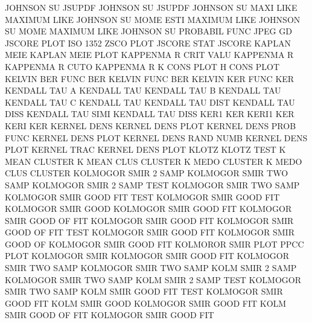 JOHNSON  SU                             JSUPDF
JOHNSON  SU                             JSUPDF
JOHNSON  SU   MAXI LIKE                 MAXIMUM  LIKE
JOHNSON  SU   MOME ESTI                 MAXIMUM  LIKE
JOHNSON  SU   MOME                      MAXIMUM  LIKE
JOHNSON  SU                             PROBABIL FUNC
JPEG                                    GD
JSCORE   PLOT                           ISO      1352 ZSCO PLOT
JSCORE   STAT                           JSCORE
KAPLAN   MEIE                           KAPLAN   MEIE PLOT
KAPPENMA R    CRIT VALU                 KAPPENMA R
KAPPENMA R    CUTO                      KAPPENMA R
K        CONS PLOT                      H        CONS PLOT
KELVIN   BER  FUNC                      BER
KELVIN   FUNC                           BER
KELVIN   KER  FUNC                      KER
KENDALL  TAU  A                         KENDALL  TAU
KENDALL  TAU  B                         KENDALL  TAU
KENDALL  TAU  C                         KENDALL  TAU
KENDALL  TAU  DIST                      KENDALL  TAU  DISS
KENDALL  TAU  SIMI                      KENDALL  TAU  DISS
KER1                                    KER
KERI1                                   KER
KERI                                    KER
KERNEL   DENS                           KERNEL   DENS PLOT
KERNEL   DENS PROB FUNC                 KERNEL   DENS PLOT
KERNEL   DENS RAND NUMB                 KERNEL   DENS PLOT
KERNEL   TRAC                           KERNEL   DENS PLOT
KLOTZ                                   KLOTZ    TEST
K        MEAN                           CLUSTER
K        MEAN CLUS                      CLUSTER
K        MEDO                           CLUSTER
K        MEDO CLUS                      CLUSTER
KOLMOGOR SMIR 2    SAMP                 KOLMOGOR SMIR TWO  SAMP
KOLMOGOR SMIR 2    SAMP TEST            KOLMOGOR SMIR TWO  SAMP
KOLMOGOR SMIR GOOD FIT  TEST            KOLMOGOR SMIR GOOD FIT
KOLMOGOR SMIR GOOD                      KOLMOGOR SMIR GOOD FIT
KOLMOGOR SMIR GOOD OF   FIT             KOLMOGOR SMIR GOOD FIT
KOLMOGOR SMIR GOOD OF   FIT  TEST       KOLMOGOR SMIR GOOD FIT
KOLMOGOR SMIR GOOD OF                   KOLMOGOR SMIR GOOD FIT
KOLMOROR SMIR PLOT                      PPCC     PLOT
KOLMOGOR SMIR                           KOLMOGOR SMIR GOOD FIT
KOLMOGOR SMIR TWO  SAMP                 KOLMOGOR SMIR TWO  SAMP
KOLM     SMIR 2    SAMP                 KOLMOGOR SMIR TWO  SAMP
KOLM     SMIR 2    SAMP TEST            KOLMOGOR SMIR TWO  SAMP
KOLM     SMIR GOOD FIT  TEST            KOLMOGOR SMIR GOOD FIT
KOLM     SMIR GOOD                      KOLMOGOR SMIR GOOD FIT
KOLM     SMIR GOOD OF   FIT             KOLMOGOR SMIR GOOD FIT
